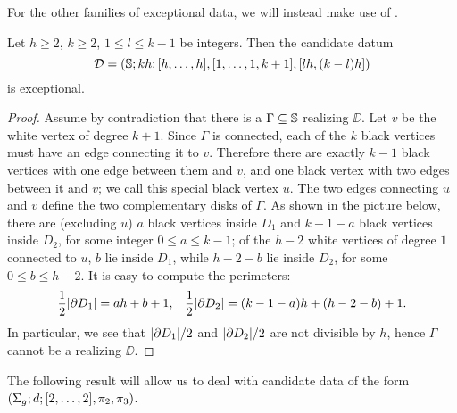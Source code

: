 For the other families of exceptional data, we will instead make use of \dessins{}.

\begin{proposition}\label{short-partition:th:exceptional-composite}
Let $h\ge 2$, $k\ge 2$, $1\le l\le k-1$ be integers. Then the candidate datum
\[
\mathcal{D}=(\mathbb{S}{};kh;[h,\ldots,h],[1,\ldots,1,k+1],[lh,(k-l)h])
\]
is exceptional.
\end{proposition}
\begin{proof}
Assume by contradiction that there is a \dessin{} $\Gamma\subseteq\mathbb{S}{}$ realizing $\DD$. Let $v$ be the white vertex of degree $k+1$. Since $\Gamma$ is connected, each of the $k$ black vertices must have an edge connecting it to $v$. Therefore there are exactly $k-1$ black vertices with one edge between them and $v$, and one black vertex with two edges between it and $v$; we call this special black vertex $u$. The two edges connecting $u$ and $v$ define the two complementary disks of $\Gamma$. As shown in the picture below, there are (excluding $u$) $a$ black vertices inside $D_1$ and $k-1-a$ black vertices inside $D_2$, for some integer $0\le a\le k-1$; of the $h-2$ white vertices of degree $1$ connected to $u$, $b$ lie inside $D_1$, while $h-2-b$ lie inside $D_2$, for some $0\le b\le h-2$. It is easy to compute the perimeters:
\begin{align*}
\frac{1}{2}\lvert \partial D_1\rvert=ah+b+1,&&\frac{1}{2}\lvert \partial D_2\rvert=(k-1-a)h+(h-2-b)+1.
\end{align*}
In particular, we see that $\lvert \partial D_1\rvert/2$ and $\lvert \partial D_2\rvert/2$ are not divisible by $h$, hence $\Gamma$ cannot be a \dessin{} realizing $\DD$.
\end{proof}

The following result will allow us to deal with candidate data of the form $(\Sigma_{g};d;[2,\ldots,2],\pi_2,\pi_3)$.

